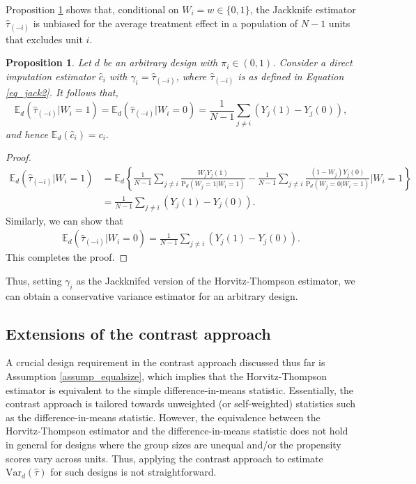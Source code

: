 \documentclass[12pt]{article}
\newcommand{\Var}{{\text{Var}}}
\newcommand{\E}{{\mathbb{E}}}
\renewcommand{\Pr}{{\text{P}}}
\newtheorem{proposition}[theorem]{Proposition}
\begin{document}
Proposition \ref{prop_jack_general} shows that, conditional on $W_i = w\in \{0,1\}$, the Jackknife estimator $\hat{\tau}_{(-i)}$ is unbiased for the average treatment effect in a population of $N-1$ units that excludes unit $i$. 
\begin{proposition}\normalfont
Let $d$ be an arbitrary design with $\pi_i \in (0,1)$. Consider a direct imputation estimator $\hat{c}_i$ with $\gamma_i = \hat{\tau}_{(-i)}$, where $\hat{\tau}_{(-i)}$ is as defined in Equation \ref{eq_jack2}. It follows that,
$$\E_d(\hat{\tau}_{(-i)}|W_i = 1) = \E_d(\hat{\tau}_{(-i)}|W_i = 0) = \frac{1}{N-1}\sum_{j \neq i}(Y_j(1) - Y_j(0)),$$
and hence $\E_d(\hat{c}_i) = c_i.$
    \label{prop_jack_general}    
\end{proposition}
\begin{proof}
    
\begin{align}
\E_d(\hat{\tau}_{(-i)}|W_i = 1) &= \E_d \left\{\frac{1}{N-1}\sum_{j \neq i}\frac{W_jY_j(1)}{\Pr_d(W_j = 1|W_i=1)} - \frac{1}{N-1}\sum_{j \neq i}\frac{(1-W_j)Y_j(0)}{\Pr_d(W_j = 0|W_i=1)}  \Bigg|W_i = 1 \right\}   \nonumber\\
& = \frac{1}{N-1}\sum_{j \neq i}(Y_j(1) - Y_j(0)).
\end{align}
Similarly, we can show that
\begin{align}
\E_d(\hat{\tau}_{(-i)}|W_i = 0) = \frac{1}{N-1}\sum_{j \neq i}(Y_j(1) - Y_j(0)).   
\end{align}
This completes the proof.
\end{proof}
Thus, setting $\gamma_i$ as the Jackknifed version of the Horvitz-Thompson estimator, we can obtain a conservative variance estimator for an arbitrary design.


\subsection{Extensions of the contrast approach}
\label{sec_substitution_extension}
A crucial design requirement in the contrast approach discussed thus far is Assumption \ref{assump_equalsize}, which implies that the Horvitz-Thompson estimator is equivalent to the simple difference-in-means statistic. Essentially, the contrast approach is tailored towards unweighted (or self-weighted) statistics such as the difference-in-means statistic. However, the equivalence between the Horvitz-Thompson estimator and the difference-in-means statistic does not hold in general for designs where the group sizes are unequal and/or the propensity scores vary across units. 
Thus, applying the contrast approach to estimate $\Var_d(\hat{\tau})$ for such designs is not straightforward. 
\end{document}
